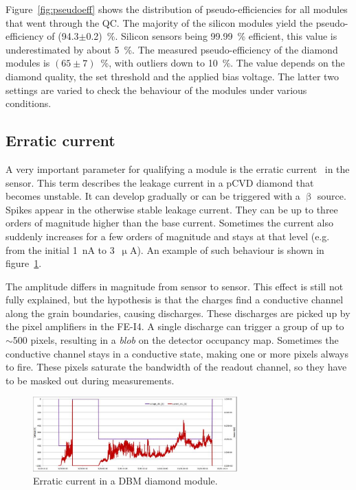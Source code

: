 Figure~\ref{fig:pseudoeff} shows the distribution of pseudo-efficiencies for all modules that went through the QC. The majority of the silicon modules yield the pseudo-efficiency of (94.3$\pm$0.2)~\%. Silicon sensors being 99.99~\% efficient, this value is underestimated by about 5~\%. The measured pseudo-efficiency of the diamond modules is $(65\pm7)$~\%, with outliers down to 10~\%. The value depends on the diamond quality, the set threshold and the applied bias voltage. The latter two settings are varied to check the behaviour of the modules under various conditions. 

\subsection{Erratic current}
A very important parameter for qualifying a module is the erratic current~\cite{} in the sensor. This term describes the leakage current in a pCVD diamond that becomes unstable. It can develop gradually or can be triggered with a $\upbeta$ source. Spikes appear in the otherwise stable leakage current. They can be up to three orders of magnitude higher than the base current. Sometimes the current also suddenly increases for a few orders of magnitude and stays at that level (e.g. from the initial 1~nA to 3~$\upmu$A). An example of such behaviour is shown in figure~\ref{fig:erratic1}. 

The amplitude differs in magnitude from sensor to sensor. This effect is still not fully explained, but the hypothesis is that the charges find a conductive channel along the grain boundaries, causing discharges. These discharges are picked up by the pixel amplifiers in the FE-I4. A single discharge can trigger a group of up to $\sim$500 pixels, resulting in a \emph{blob} on the detector occupancy map. Sometimes the conductive channel stays in a conductive state, making one or more pixels always to fire. These pixels saturate the bandwidth of the readout channel, so they have to be masked out during measurements. 

\begin{figure}[!t]
\centering
\includegraphics[width=0.7\textwidth]{04_charge_monitoring/pics/erratic1} 
\caption{Erratic current in a DBM diamond module.}
\label{fig:erratic1}
\end{figure}

